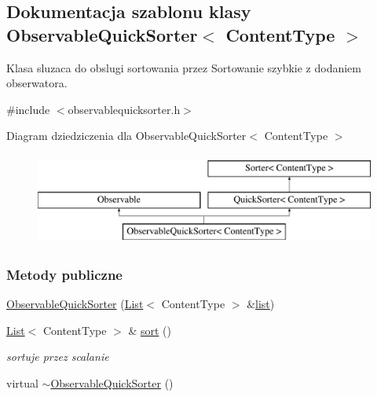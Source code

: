 \hypertarget{class_observable_quick_sorter}{\subsection{Dokumentacja szablonu klasy Observable\-Quick\-Sorter$<$ Content\-Type $>$}
\label{class_observable_quick_sorter}
}


Klasa sluzaca do obslugi sortowania przez Sortowanie szybkie z dodaniem obserwatora.  




{\ttfamily \#include $<$observablequicksorter.\-h$>$}

Diagram dziedziczenia dla Observable\-Quick\-Sorter$<$ Content\-Type $>$\begin{figure}[H]
\begin{center}
\leavevmode
\includegraphics[height=3.000000cm]{class_observable_quick_sorter}
\end{center}
\end{figure}
\subsubsection*{Metody publiczne}
\begin{DoxyCompactItemize}
\item 
\hyperlink{class_observable_quick_sorter_a46c57ea80fad3748645d9a69051d1627}{Observable\-Quick\-Sorter} (\hyperlink{class_list}{List}$<$ Content\-Type $>$ \&\hyperlink{class_quick_sorter_a66cd768b6d8a77952f004be7aad87a0e}{list})
\item 
\hyperlink{class_list}{List}$<$ Content\-Type $>$ \& \hyperlink{class_observable_quick_sorter_aef09bb6859fc79d85de104a4eddfa348}{sort} ()
\begin{DoxyCompactList}\small\item\em sortuje przez scalanie \end{DoxyCompactList}\item 
virtual \hyperlink{class_observable_quick_sorter_ad34a3934f8d7cb07d125d1dda7e9b538}{$\sim$\-Observable\-Quick\-Sorter} ()
\end{DoxyCompactItemize}

